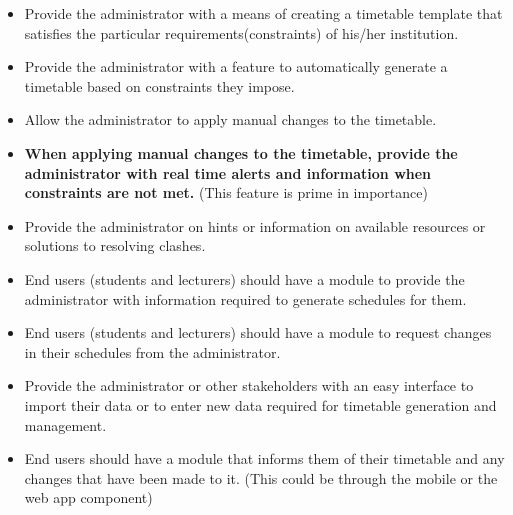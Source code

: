 \documentclass{scrreprt}
\begin{document}
\begin{itemize}
 \item Provide the administrator with a means of creating a timetable template that satisfies the particular requirements(constraints) of his/her institution.
 \item Provide the administrator with a feature to automatically generate a timetable based on constraints they impose.
 \item Allow the administrator to apply manual changes to the timetable.
 \item \textbf{ When applying manual changes to the timetable, provide the administrator with real time alerts and information when constraints are not met.} (This feature is prime in importance)
 \item Provide the administrator on hints or information on available resources or solutions to resolving clashes.
 \item End users (students and lecturers) should have a module to provide the administrator with information required to generate schedules for them.
 \item End users (students and lecturers) should have a module to request changes in their schedules from the administrator.
 \item Provide the administrator or other stakeholders with an easy interface to import their data or to enter new data required for timetable generation and management.
 \item End users should have a module that informs them of their timetable and any changes that have been made to it. (This could be through the mobile or the web app component)
\end{itemize}

\begin{comment}
$<$Summarize the major functions the product must perform or must let the user 
perform. Details will be provided in Section 3, so only a high level summary 
(such as a bullet list) is needed here. Organize the functions to make them 
understandable to any reader of the SRS. A picture of the major groups of 
related requirements and how they relate, such as a top level data flow diagram 
or object class diagram, is often effective.$>$
\end{comment}
\end{document}
